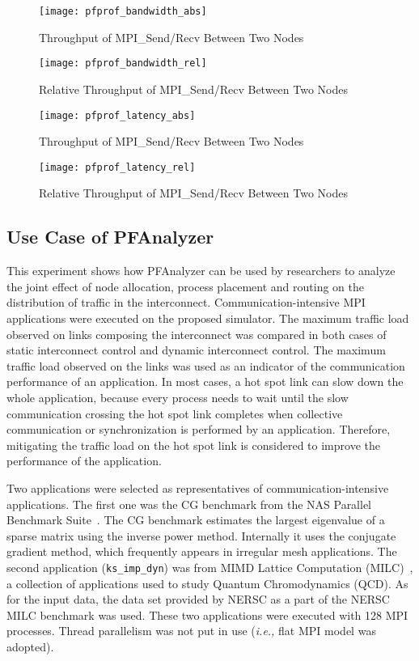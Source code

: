 \begin{figure}
    \centering
    \texttt{[image: pfprof\_bandwidth\_abs]}
    \caption{Throughput of MPI\_Send/Recv Between Two Nodes}%
    \label{fig:pfprof-bw-abs}
\end{figure}

\begin{figure}
    \centering
    \texttt{[image: pfprof\_bandwidth\_rel]}
    \caption{Relative Throughput of MPI\_Send/Recv Between Two Nodes}%
    \label{fig:pfprof-bw-rel}
\end{figure}

\begin{figure}
    \centering
    \texttt{[image: pfprof\_latency\_abs]}
    \caption{Throughput of MPI\_Send/Recv Between Two Nodes}%
    \label{fig:pfprof-lat-abs}
\end{figure}

\begin{figure}
    \centering
    \texttt{[image: pfprof\_latency\_rel]}
    \caption{Relative Throughput of MPI\_Send/Recv Between Two Nodes}%
    \label{fig:pfprof-lat-rel}
\end{figure}

\subsection{Use Case of PFAnalyzer}\label{sec:ii-simulation-results}

This experiment shows how PFAnalyzer can be used by researchers to analyze the
joint effect of node allocation, process placement and routing on the
distribution of traffic in the interconnect. Communication-intensive MPI
applications were executed on the proposed simulator. The maximum traffic load
observed on links composing the interconnect was compared in both cases of
static interconnect control and dynamic interconnect control. The maximum
traffic load observed on the links was used as an indicator of the
communication performance of an application. In most cases, a hot spot link
can slow down the whole application, because every process needs to wait until
the slow communication crossing the hot spot link completes when collective
communication or synchronization is performed by an application. Therefore,
mitigating the traffic load on the hot spot link is considered to improve the
performance of the application.

Two applications were selected as representatives of communication-intensive
applications. The first one was the CG benchmark from the NAS Parallel
Benchmark Suite~\autocite{Bailey1991}. The CG benchmark estimates the largest
eigenvalue of a sparse matrix using the inverse power method. Internally it
uses the conjugate gradient method, which frequently appears in irregular mesh
applications. The second application (\lstinline!ks_imp_dyn!) was from MIMD
Lattice Computation (MILC)~\autocite{milc}, a collection of applications used
to study Quantum Chromodynamics (QCD). As for the input data, the data set
provided by NERSC as a part of the NERSC MILC benchmark was used. These two
applications were executed with 128 MPI processes. Thread parallelism was not
put in use (\emph{i.e.,} flat MPI model was adopted).

